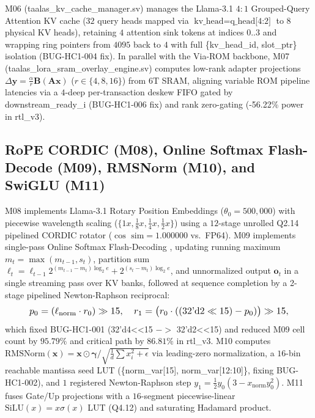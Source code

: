 \documentclass[10pt,journal,compsoc]{IEEEtran}
\def\texttt#1{#1}%
\def\textbf#1{#1}%
\def\to{->}%
\def\times{x}%
\begin{document}
\texttt{M06} (\texttt{taalas\_kv\_cache\_manager.sv}) manages the Llama-3.1 $4:1$ Grouped-Query Attention KV cache ($32$ query heads mapped via $\text{\texttt{kv\_head}} = \text{\texttt{q\_head[4:2]}}$ to $8$ physical KV heads), retaining $4$ attention sink tokens \cite{xiao2024streamingllm} at indices $0..3$ and wrapping ring pointers from $4095$ back to $4$ with full \texttt{\{kv\_head\_id, slot\_ptr\}} isolation (\texttt{BUG-HC1-004} fix). In parallel with the Via-ROM backbone, \texttt{M07} (\texttt{taalas\_lora\_sram\_overlay\_engine.sv}) computes low-rank adapter projections $\Delta \mathbf{y} = \frac{\alpha}{r}\mathbf{B}(\mathbf{A}\mathbf{x})$ ($r \in \{4,8,16\}$) from $6\text{T}$ SRAM, aligning variable ROM pipeline latencies via a $4$-deep per-transaction deskew FIFO gated by \texttt{downstream\_ready\_i} (\texttt{BUG-HC1-006} fix) and rank zero-gating (\texttt{-56.22\%} power in \texttt{rtl\_v3}).

\subsection{RoPE CORDIC (\texttt{M08}), Online Softmax Flash-Decode (\texttt{M09}), RMSNorm (\texttt{M10}), and SwiGLU (\texttt{M11})}
\texttt{M08} implements Llama-3.1 Rotary Position Embeddings \cite{su2024roformer} ($\theta_0 = 500,000$) with piecewise wavelength scaling ($\{1\times, \frac{1}{8}\times, \frac{1}{4}\times, \frac{1}{2}\times\}$) using a $12$-stage unrolled \texttt{Q2.14} pipelined CORDIC rotator ($\cos\text{ sim} = 1.000000$ vs.\ \texttt{FP64}). \texttt{M09} implements single-pass Online Softmax Flash-Decoding \cite{milakov2018online,dao2023flashattention2}, updating running maximum $m_t = \max(m_{t-1}, s_t)$, partition sum $\ell_t = \ell_{t-1}2^{(m_{t-1}-m_t)\log_2 e} + 2^{(s_t-m_t)\log_2 e}$, and unnormalized output $\mathbf{o}_t$ in a single streaming pass over KV banks, followed at sequence completion by a \textbf{2-stage pipelined Newton-Raphson reciprocal}:
\begin{equation}
\resizebox{0.88\columnwidth}{!}{$\displaystyle p_0 = (\ell_{\text{norm}} \cdot r_0) \gg 15, \quad r_1 = \bigl(r_0 \cdot ((32\text{'d2} \ll 15) - p_0)\bigr) \gg 15,$}
\label{eq:nr_recip}
\end{equation}
which fixed \texttt{BUG-HC1-001} (\texttt{32'd4<<15} $\to$ \texttt{32'd2<<15}) and reduced \texttt{M09} cell count by $\mathbf{95.79\%}$ and critical path by $\mathbf{86.81\%}$ in \texttt{rtl\_v3}. \texttt{M10} computes $\text{RMSNorm}(\mathbf{x}) = \mathbf{x} \odot \boldsymbol{\gamma} / \sqrt{\frac{1}{d}\sum x_i^2 + \epsilon}$ via leading-zero normalization, a $16$-bin reachable mantissa seed LUT (\texttt{\{norm\_var[15], norm\_var[12:10]\}}, fixing \texttt{BUG-HC1-002}), and $1$ registered Newton-Raphson step $y_1 = \frac{1}{2}y_0(3 - x_{\text{norm}}y_0^2)$. \texttt{M11} fuses Gate/Up projections with a $16$-segment piecewise-linear $\text{SiLU}(x) = x\sigma(x)$ LUT (\texttt{Q4.12}) and saturating Hadamard product.
\end{document}
